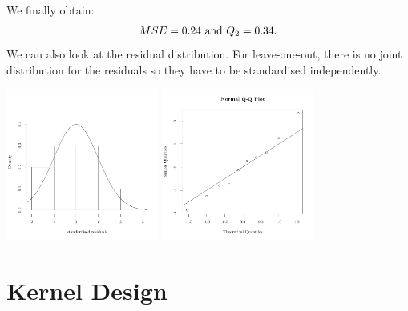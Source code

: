 \begin{frame}{}
We finally obtain:
 $$MSE = 0.24 \text{ and } Q_2 = 0.34.\vspace{3mm}$$
We can also look at the residual distribution. For leave-one-out, there is no joint distribution for the residuals so they have to be standardised independently.
\begin{center}
\includegraphics[height=5cm]{3_gaussian_process_regression/figures/R/VALID_crossvalhist} \qquad
\includegraphics[height=5cm]{3_gaussian_process_regression/figures/R/VALID_crossvalqqplot}
\end{center}
\end{frame}


\section{Kernel Design}
\subsection{}

